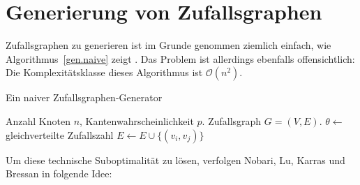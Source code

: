 \documentclass[11pt,abstracton]{scrreprt} %
\theoremstyle{definition}
\begin{document}
\section{Generierung von Zufallsgraphen}

Zufallsgraphen zu generieren ist im Grunde genommen ziemlich einfach, wie Algorithmus~\ref{gen.naive} zeigt \cite{fastalgo}. Das Problem ist allerdings ebenfalls offensichtlich: Die Komplexitätsklasse dieses Algorithmus ist $\mathcal{O}(n^2)$.

\begin{algorithm}
\caption{Ein naiver Zufallsgraphen-Generator}
\label{gen.naive}
\begin{algorithmic}
\Require
	\Statex Anzahl Knoten $n$,
	\Statex Kantenwahrscheinlichkeit $p$.
\Ensure
	\Statex Zufallsgraph $G = (V, E)$.
\Statex
{}
\State $\theta\gets$ gleichverteilte Zufallszahl
\State $E \gets E \cup \{(v_i,v_j)\}$
\EndIf
\EndFor
\EndFor
\end{algorithmic}
\end{algorithm}


Um diese technische Suboptimalität zu lösen, verfolgen Nobari, Lu, Karras und Bressan in \cite{fastalgo} folgende Idee:
\end{document}
